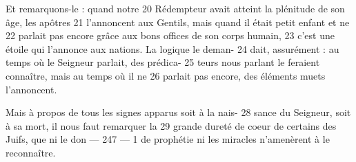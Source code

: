 Et remarquons-le : quand notre	 
20	 	Rédempteur avait atteint la plénitude de son âge, les apôtres	 
21	 	l'annoncent aux Gentils, mais quand il était petit enfant et ne	 
22	 	parlait pas encore grâce aux bons offices de son corps humain,	 
23	 	c'est une étoile qui l'annonce aux nations. La logique le deman-	 
24	 	dait, assurément : au temps où le Seigneur parlait, des prédica-	 
25	 	teurs nous parlant le feraient connaître, mais au temps où il ne	 
26	 	parlait pas encore, des éléments muets l'annoncent.

Mais à propos de tous les signes apparus soit à la nais-	 
28	 	sance du Seigneur, soit à sa mort, il nous faut remarquer la	 
29	 	grande dureté de coeur de certains des Juifs, que ni le don	 
 	--- 247 ---	 
1	 	de prophétie ni les miracles n'amenèrent à le reconnaître.